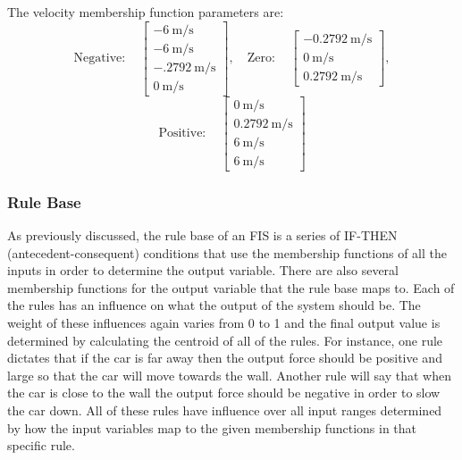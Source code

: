 The velocity membership function parameters are: \begin{displaymath} \mathrm{Negative:}\quad
\begin{bmatrix}
\SI{-6}{\metre\per\second}\\\SI{-6}{\metre\per\second}\\\SI{-.2792}{\metre\per\second}\\\SI{0}{\metre\per\second}
\end{bmatrix}, \quad \mathrm{Zero:}\quad \begin{bmatrix}
    \SI{-0.2792}{\metre\per\second}\\\SI{0}{\metre\per\second}\\\SI{0.2792}{\metre\per\second} \end{bmatrix},
\end{displaymath} \begin{displaymath} \mathrm{Positive:}\quad \begin{bmatrix}
\SI{0}{\metre\per\second}\\\SI{0.2792}{\metre\per\second}\\\SI{6}{\metre\per\second}\\\SI{6}{\metre\per\second}
\end{bmatrix} \end{displaymath}
\subsubsection{Rule Base}\label{ss:rulebase}
As previously discussed, the rule base of an FIS is a series of IF-THEN (antecedent-consequent) conditions
that use the membership functions of all the inputs in order to determine the output variable. There are also
several membership functions for the output variable that the rule base maps to. Each of the rules has an
influence on what the output of the system should be. The weight of these influences again varies from 0 to 1
and the final output value is determined by calculating the centroid of all of the rules. For instance, one
rule dictates that if the car is far away then the output force should be positive and large so that the car
will move towards the wall. Another rule will say that when the car is close to the wall the output force
should be negative in order to slow the car down. All of these rules have influence over all input ranges
determined by how the input variables map to the given membership functions in that specific rule.

